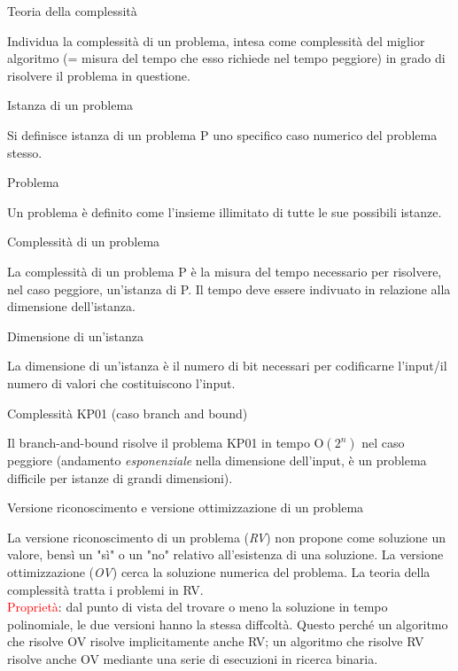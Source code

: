 \documentclass[answers, a4paper, 11pt]{exam}
\begin{document}
\begin{questions}
\question Teoria della complessità
\begin{solution}
Individua la complessità di un problema, intesa come complessità del miglior algoritmo (= misura del tempo che esso richiede nel tempo peggiore) in grado di risolvere il problema in questione.
\end{solution}
\question Istanza di un problema
\begin{solution}
Si definisce istanza di un problema P uno specifico caso numerico del problema stesso.
\end{solution}
\question Problema
\begin{solution}
Un problema è definito come l'insieme illimitato di tutte le sue possibili istanze.
\end{solution}
\question Complessità di un problema
\begin{solution}
La complessità di un problema P è la misura del tempo necessario per risolvere, nel caso peggiore, un'istanza di P. Il tempo deve essere indivuato in relazione alla dimensione dell'istanza.
\end{solution}
\question Dimensione di un'istanza
\begin{solution}
La dimensione di un'istanza è il numero di bit necessari per codificarne l'input/il numero di valori che costituiscono l'input.
\end{solution}
\question Complessità KP01 (caso branch and bound)
\begin{solution}
Il branch-and-bound risolve il problema KP01 in tempo $\textrm{O}(2^{n})$ nel caso peggiore (andamento \emph{esponenziale} nella dimensione dell'input, è un problema difficile per istanze di grandi dimensioni). 
\end{solution}
\question Versione riconoscimento e versione ottimizzazione di un problema
\begin{solution}
La versione riconoscimento di un problema (\emph{RV}) non propone come soluzione un valore, bensì un "sì" o un "no" relativo all'esistenza di una soluzione. La versione ottimizzazione (\emph{OV}) cerca la soluzione numerica del problema. La teoria della complessità tratta i problemi in RV.\\
\textcolor{red}{Proprietà}: dal punto di vista del trovare o meno la soluzione in tempo polinomiale, le due versioni hanno la stessa diffcoltà. Questo perché un algoritmo che risolve OV risolve implicitamente anche RV; un algoritmo che risolve RV risolve anche OV mediante una serie di esecuzioni in ricerca binaria. 

\end{solution}
\end{questions}
\end{document}
